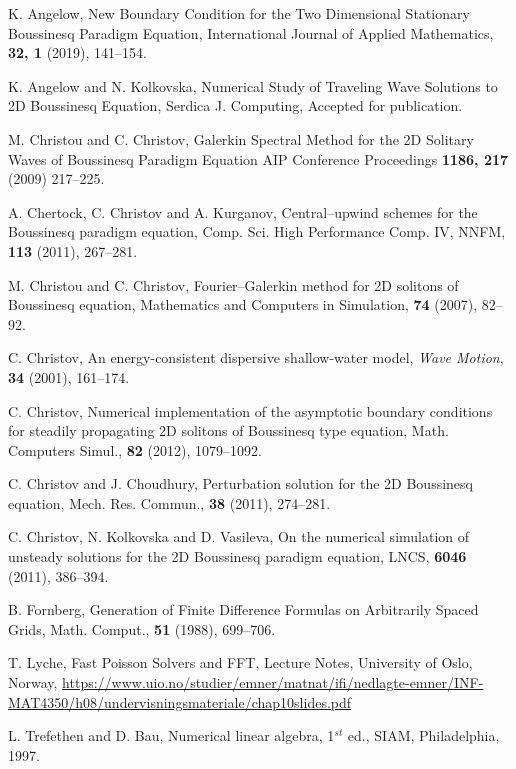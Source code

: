\begin{thebibliography}{99.}%

K. Angelow, 
New Boundary Condition for the Two Dimensional Stationary Boussinesq Paradigm Equation,
International Journal of Applied Mathematics, \textbf{32, 1} (2019), 141--154.

K. Angelow and N. Kolkovska, 
Numerical Study of Traveling Wave Solutions to 2D Boussinesq Equation,
Serdica J. Computing,  Accepted for publication.

M. Christou and C. Christov, 
Galerkin Spectral Method for the 2D Solitary Waves of Boussinesq Paradigm Equation
AIP Conference Proceedings \textbf{1186, 217} (2009) 217--225.

A. Chertock, C. Christov and A. Kurganov, 
Central--upwind schemes for the  Boussinesq paradigm equation,
Comp. Sci. High Performance Comp. IV, NNFM, \textbf{113} (2011), 267--281.

M. Christou and C. Christov, 
Fourier–Galerkin method for 2D solitons of Boussinesq equation, 
Mathematics and Computers in Simulation, \textbf{74} (2007), 82--92.

C. Christov, 
An energy-consistent dispersive shallow-water model, 
{\it Wave Motion}, \textbf{34} (2001), 161--174.

C. Christov, 
Numerical implementation of the asymptotic boundary conditions
for steadily propagating 2D solitons of Boussinesq type equation,       
Math. Computers  Simul., \textbf{82} (2012),  1079--1092.

C. Christov and J. Choudhury, 
Perturbation solution  for the 2D Boussinesq equation,       
Mech. Res. Commun., \textbf{38} (2011),  274--281.

C. Christov, N. Kolkovska and D. Vasileva, 
On the numerical simulation of unsteady solutions for the 2D Boussinesq paradigm equation,
LNCS, \textbf{6046} (2011), 386--394.

B. Fornberg, 
Generation of Finite Difference Formulas on Arbitrarily Spaced Grids, 
Math. Comput., \textbf{51} (1988),  699--706.

T. Lyche,
Fast Poisson Solvers and FFT, 
Lecture Notes, University of Oslo, Norway,
\url{https://www.uio.no/studier/emner/matnat/ifi/nedlagte-emner/INF-MAT4350/h08/undervisningsmateriale/chap10slides.pdf}

L. Trefethen and D. Bau,
Numerical linear algebra,
1$^{st}$ ed., SIAM, Philadelphia, 1997.

\end{thebibliography}
